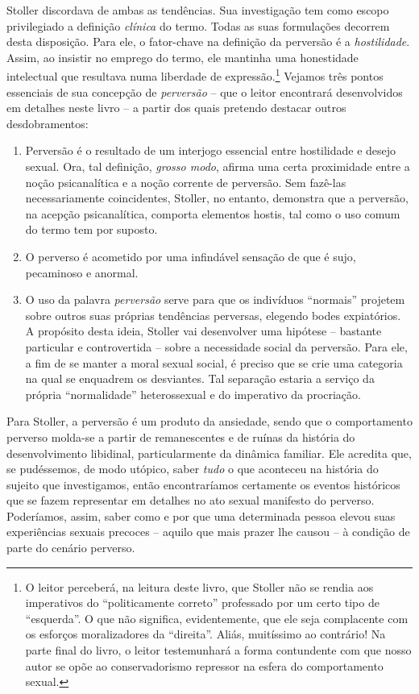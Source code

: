 Stoller discordava de ambas as tendências. Sua investigação tem como
escopo privilegiado a definição \emph{clínica} do termo. Todas as suas
formulações decorrem desta disposição. Para ele, o fator-chave na
definição da perversão é a \emph{hostilidade}. Assim, ao insistir no
emprego do termo, ele mantinha uma honestidade intelectual que resultava
numa liberdade de expressão.\footnote{O leitor perceberá, na leitura
  deste livro, que Stoller não se rendia aos imperativos do
  ``politicamente correto'' professado por um certo tipo de
  ``esquerda''. O que não significa, evidentemente, que ele seja
  complacente com os esforços moralizadores da ``direita''. Aliás,
  muitíssimo ao contrário! Na parte final do livro, o leitor
  testemunhará a forma contundente com que nosso autor se opõe ao
  conservadorismo repressor na esfera do comportamento sexual.} Vejamos
três pontos essenciais de sua concepção de \emph{perversão} -- que o
leitor encontrará desenvolvidos em detalhes neste livro -- a partir dos
quais pretendo destacar outros desdobramentos:

\begin{enumerate}
\def\labelenumi{\arabic{enumi}.}
\item
  Perversão é o resultado de um interjogo essencial entre hostilidade e
  desejo sexual. Ora, tal definição, \emph{grosso modo}, afirma uma
  certa proximidade entre a noção psicanalítica e a noção corrente de
  perversão. Sem fazê-las necessariamente coincidentes, Stoller, no
  entanto, demonstra que a perversão, na acepção psicanalítica, comporta
  elementos hostis, tal como o uso comum do termo tem por suposto.
\item
  O perverso é acometido por uma infindável sensação de que é sujo,
  pecaminoso e anormal.
\item
  O uso da palavra \emph{perversão} serve para que os indivíduos
  ``normais'' projetem sobre outros suas próprias tendências perversas,
  elegendo bodes expiatórios. A propósito desta ideia, Stoller vai
  desenvolver uma hipótese -- bastante particular e controvertida --
  sobre a necessidade social da perversão. Para ele, a fim de se manter
  a moral sexual social, é preciso que se crie uma categoria na qual se
  enquadrem os desviantes. Tal separação estaria a serviço da própria
  ``normalidade'' heterossexual e do imperativo da procriação.
\end{enumerate}

Para Stoller, a perversão é um produto da ansiedade, sendo que o
comportamento perverso molda-se a partir de remanescentes e de ruínas da
história do desenvolvimento libidinal, particularmente da dinâmica
familiar. Ele acredita que, se pudéssemos, de modo utópico, saber
\emph{tudo} o que aconteceu na história do sujeito que investigamos,
então encontraríamos certamente os eventos históricos que se fazem
representar em detalhes no ato sexual manifesto do perverso. Poderíamos,
assim, saber como e por que uma determinada pessoa elevou suas
experiências sexuais precoces -- aquilo que mais prazer lhe causou -- à
condição de parte do cenário perverso.

